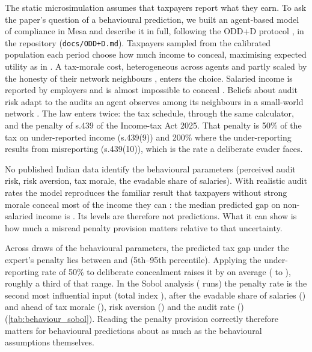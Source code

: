 \documentclass[sn-apa]{sn-jnl}
\begin{document}
\begin{appendices}
The static microsimulation assumes that taxpayers report what they earn.
To ask the paper's question of a behavioural prediction, we built an
agent-based model of compliance in Mesa \citep{mesa2025} and describe it
in full, following the ODD+D protocol \citep{muller2013describing}, in the
repository (\texttt{docs/ODD+D.md}). Taxpayers sampled from the calibrated
population each period choose how much income to conceal, maximising
expected utility as in \citet{allingham1972income}. A tax-morale cost,
heterogeneous across agents and partly scaled by the honesty of their network
neighbours \citep{myles1996model,hashimzade2013applications}, enters the
choice. Salaried income is reported by employers and is almost impossible to
conceal \citep{kleven2011unwilling}. Beliefs about audit risk adapt to the
audits an agent observes among its neighbours in a small-world network
\citep{watts1998collective}. The law enters twice: the tax schedule, through
the same calculator, and the penalty of s.439 of the Income-tax Act 2025.
That penalty is 50\% of the tax on under-reported income (s.439(9)) and
200\% where the under-reporting results from misreporting (s.439(10)), which
is the rate a deliberate evader faces.

No published Indian data identify the behavioural parameters (perceived
audit risk, risk aversion, tax morale, the evadable share of salaries).
With realistic audit rates the model reproduces the familiar result that
taxpayers without strong morale conceal most of the income they can
\citep{alm2012measuring}: the median predicted gap on non-salaried income is
. Its levels are therefore not predictions. What it can
show is how much a misread penalty provision matters relative to that
uncertainty.

Across  draws of the behavioural parameters, the predicted tax
gap under the expert's penalty lies between  and
 (5th--95th percentile). Applying the under-reporting
rate of 50\% to deliberate concealment raises it by  on
average ( to ), roughly a third of
that range. In the Sobol analysis ( runs) the penalty rate is
the second most influential input (total index ),
after the evadable share of salaries () and
ahead of tax morale (), risk aversion
() and the audit rate ()
(\cref{tab:behaviour_sobol}). Reading the penalty provision correctly
therefore matters for behavioural predictions about as much as the
behavioural assumptions themselves.


\end{appendices}
\end{document}
